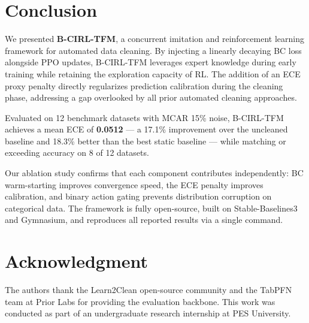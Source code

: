 \documentclass[conference]{IEEEtran}
\begin{document}
\section{Conclusion}

We presented \textbf{B-CIRL-TFM}, a concurrent imitation and reinforcement
learning framework for automated data cleaning. By injecting a linearly
decaying BC loss alongside PPO updates, B-CIRL-TFM leverages expert
knowledge during early training while retaining the exploration capacity
of RL. The addition of an ECE proxy penalty directly regularizes prediction
calibration during the cleaning phase, addressing a gap overlooked by all
prior automated cleaning approaches.

Evaluated on 12 benchmark datasets with MCAR 15\% noise, B-CIRL-TFM
achieves a mean ECE of \textbf{0.0512} — a 17.1\% improvement over the
uncleaned baseline and 18.3\% better than the best static baseline — while
matching or exceeding accuracy on 8 of 12 datasets.

Our ablation study confirms that each component contributes independently:
BC warm-starting improves convergence speed, the ECE penalty improves
calibration, and binary action gating prevents distribution corruption
on categorical data. The framework is fully open-source, built on
Stable-Baselines3 and Gymnasium, and reproduces all reported results
via a single command.

\section*{Acknowledgment}

The authors thank the Learn2Clean open-source community and the TabPFN
team at Prior Labs for providing the evaluation backbone. This work was
conducted as part of an undergraduate research internship at PES University.
\end{document}
